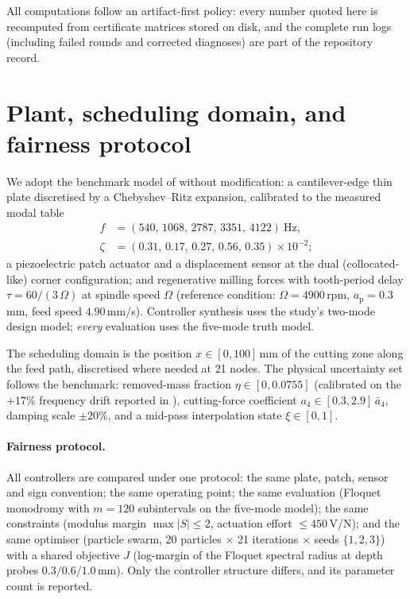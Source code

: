 \documentclass[preprint,12pt]{elsarticle}
\newcommand{\ap}{a_{\mathrm{p}}}
\begin{document}
All computations follow an artifact-first policy: every number quoted
here is recomputed from certificate matrices stored on disk, and the
complete run logs (including failed rounds and corrected diagnoses) are
part of the repository record.

\section{Plant, scheduling domain, and fairness protocol}
\label{sec:plant}

We adopt the benchmark model of \cite{Du2024} without modification: a
cantilever-edge thin plate discretised by a Chebyshev--Ritz expansion,
calibrated to the measured modal table
\begin{align*}
f &= (540,\, 1068,\, 2787,\, 3351,\, 4122)\ \mathrm{Hz},\\
\zeta &= (0.31,\, 0.17,\, 0.27,\, 0.56,\, 0.35)\times 10^{-2};
\end{align*}
a piezoelectric
patch actuator and a displacement sensor at the dual (collocated-like)
corner configuration; and regenerative milling forces with tooth-period
delay $\tau = 60/(3\,\Omega)$ at spindle speed $\Omega$ (reference
condition: $\Omega = 4900$\,rpm, $\ap = 0.3$\,mm, feed speed
$4.90$\,mm/s).  Controller synthesis uses the study's two-mode design
model; \emph{every} evaluation uses the five-mode truth model.

The scheduling domain is the position $x \in [0, 100]$\,mm of the
cutting zone along the feed path, discretised where needed at 21 nodes.
The physical uncertainty set follows the benchmark: removed-mass
fraction $\eta \in [0, 0.0755]$ (calibrated on the $+17\%$ frequency
drift reported in \cite{Du2024}), cutting-force coefficient
$a_4 \in [0.3, 2.9]\,\bar a_4$, damping scale $\pm20\%$, and a mid-pass
interpolation state $\xi \in [0,1]$.

\paragraph{Fairness protocol.}
All controllers are compared under one protocol: the same plate, patch,
sensor and sign convention; the same operating point; the same
evaluation (Floquet monodromy with $m=120$ subintervals on the
five-mode model); the same constraints (modulus margin
$\max|S|\le 2$, actuation effort $\le 450$\,V/N); and the same
optimiser (particle swarm, 20 particles $\times$ 21 iterations
$\times$ seeds $\{1,2,3\}$) with a shared objective $J$ (log-margin of
the Floquet spectral radius at depth probes $0.3/0.6/1.0$\,mm).  Only
the controller structure differs, and its parameter count is reported.
\end{document}
